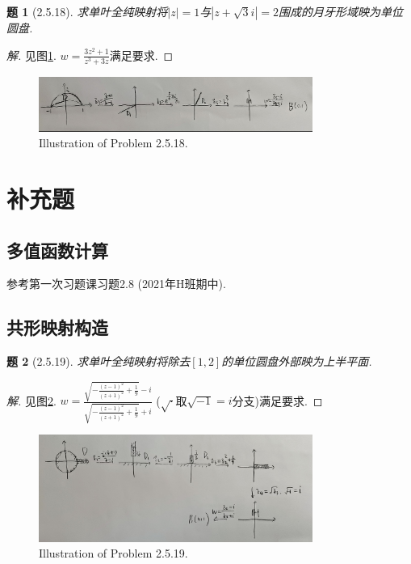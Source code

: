 \documentclass{article}[a4paper, 12pt]
\newtheorem{problem}{题}
\newenvironment{solution}{\begin{proof}[解]}{\end{proof}}
\begin{document}
\begin{problem}[2.5.18]
  求单叶全纯映射将\(|z|=1\)与\(|z+\sqrt{3}i|=2\)围成的月牙形域映为单位圆盘.
\end{problem}

\begin{solution}
  见图\ref{fig:2.5.18}. \(w=\frac{3z^2+1}{z^3+3z}\)满足要求.
\end{solution}

\begin{figure}[htbp]
  \centering
  \includegraphics[width=0.8\textwidth]{images/2.5.18.jpg}
  \caption{Illustration of Problem 2.5.18.}
  \label{fig:2.5.18}
\end{figure}

\section{补充题}

\subsection{多值函数计算}

参考第一次习题课习题2.8 (2021年H班期中).

\subsection{共形映射构造}

\begin{problem}[2.5.19]
  求单叶全纯映射将除去\([1,2]\)的单位圆盘外部映为上半平面.
\end{problem}

\begin{solution}
  见图\ref{fig:2.5.19}. \(w=\frac{\sqrt{-\frac{(z-1)^2}{(z+1)^2}+\frac19}-i}{\sqrt{-\frac{(z-1)^2}{(z+1)^2}+\frac19}+i}\) (\(\sqrt{\cdot}\)取\(\sqrt{-1}=i\)分支)满足要求.
\end{solution}

\begin{figure}[htbp]
  \centering
  \includegraphics[width=0.8\textwidth]{images/2.5.19.jpg}
  \caption{Illustration of Problem 2.5.19.}
  \label{fig:2.5.19}
\end{figure}
\end{document}
